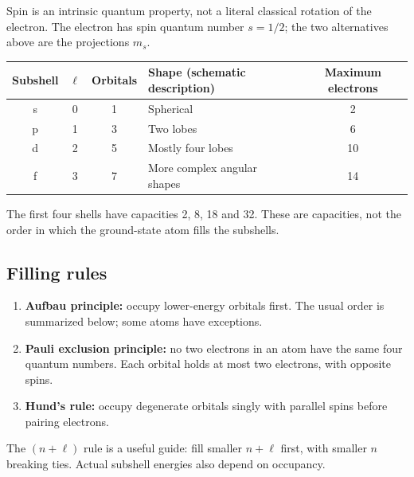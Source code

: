 \documentclass[a4paper,10pt]{article}
\begin{document}
Spin is an intrinsic quantum property, not a literal classical rotation of the
electron. The electron has spin quantum number $s=1/2$; the two alternatives
above are the projections $m_s$.

\begin{center}
\begin{tabular}{@{}ccclc@{}}
\toprule
Subshell & $\ell$ & Orbitals & Shape (schematic description) & Maximum electrons \\
\midrule
s & 0 & 1 & Spherical & 2 \\
p & 1 & 3 & Two lobes & 6 \\
d & 2 & 5 & Mostly four lobes & 10 \\
f & 3 & 7 & More complex angular shapes & 14 \\
\bottomrule
\end{tabular}
\end{center}
The first four shells have capacities 2, 8, 18 and 32. These are capacities,
not the order in which the ground-state atom fills the subshells.

\subsection{Filling rules}
\begin{enumerate}
  \item \textbf{Aufbau principle:} occupy lower-energy orbitals first.
  The usual order is summarized below; some atoms have exceptions.
  \item \textbf{Pauli exclusion principle:} no two electrons in an atom have
  the same four quantum numbers. Each orbital holds at most two electrons,
  with opposite spins.
  \item \textbf{Hund's rule:} occupy degenerate orbitals singly with parallel
  spins before pairing electrons.
\end{enumerate}
The $(n+\ell)$ rule is a useful guide: fill smaller $n+\ell$ first, with smaller
$n$ breaking ties. Actual subshell energies also depend on occupancy.
\end{document}
